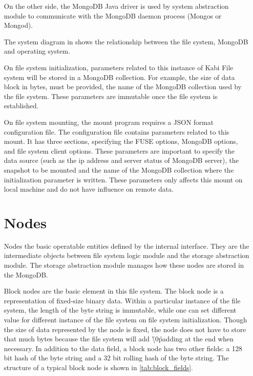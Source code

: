     On the other side, the MongoDB Java driver is used by system abstraction module to communicate with the MongoDB daemon process (Mongos or Mongod).
    
    The system diagram in  shows the relationship between the file system, MongoDB and operating system.

    On file system initialization, parameters related to this instance of Kabi File system will be stored in a MongoDB collection. For example, the size of data block in bytes, must be provided, the name of the MongoDB collection used by the file system. These parameters are immutable once the file system is established.

    On file system mounting, the mount program requires a JSON format configuration file. The configuration file contains parameters related to this mount. It has three sections, specifying the FUSE options, MongoDB options, and file system client options. These parameters are important to specify the data source (such as the ip address and server status of MongoDB server), the snapshot to be mounted and the name of the MongoDB collection where the initialization parameter is written. These parameters only affects this mount on local machine and do not have influence on remote data.

\section{Nodes}

    Nodes the basic operatable entities defined by the internal interface. They are the intermediate objects between file system logic module and the storage abstraction module. The storage abstraction module manages how these nodes are stored in the MongoDB.

    Block nodes are the basic element in this file system. The block node is a representation of fixed-size binary data. Within a particular instance of the file system, the length of the byte string is immutable, while one can set different value for different instance of the file system on file system initialization. Though the size of data represented by the node is fixed, the node does not have to store that much bytes because the file system will add \'\textbackslash0\' padding at the end when necessary. In addition to the data field, a block node has two other fields: a 128 bit hash of the byte string and a 32 bit rolling hash of the byte string. The structure of a typical block node is shown in \ref{tab:block_fields}.

